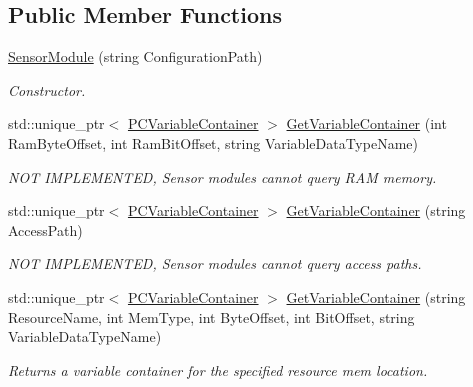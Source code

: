 \subsection*{Public Member Functions}
\begin{DoxyCompactItemize}
\item 
\hyperlink{classpc__emulator_1_1SensorModule_a5cc3adaeaf05bd9446a142088f1353c8}{Sensor\+Module} (string Configuration\+Path)\hypertarget{classpc__emulator_1_1SensorModule_a5cc3adaeaf05bd9446a142088f1353c8}{}\label{classpc__emulator_1_1SensorModule_a5cc3adaeaf05bd9446a142088f1353c8}

\begin{DoxyCompactList}\small\item\em Constructor. \end{DoxyCompactList}\item 
std\+::unique\+\_\+ptr$<$ \hyperlink{classpc__emulator_1_1PCVariableContainer}{P\+C\+Variable\+Container} $>$ \hyperlink{classpc__emulator_1_1SensorModule_affa170aa3378e2a1947eb761b308ad04}{Get\+Variable\+Container} (int Ram\+Byte\+Offset, int Ram\+Bit\+Offset, string Variable\+Data\+Type\+Name)
\begin{DoxyCompactList}\small\item\em N\+OT I\+M\+P\+L\+E\+M\+E\+N\+T\+ED, Sensor modules cannot query R\+AM memory. \end{DoxyCompactList}\item 
std\+::unique\+\_\+ptr$<$ \hyperlink{classpc__emulator_1_1PCVariableContainer}{P\+C\+Variable\+Container} $>$ \hyperlink{classpc__emulator_1_1SensorModule_aa7ed0083532cab1380b6573f96760efa}{Get\+Variable\+Container} (string Access\+Path)
\begin{DoxyCompactList}\small\item\em N\+OT I\+M\+P\+L\+E\+M\+E\+N\+T\+ED, Sensor modules cannot query access paths. \end{DoxyCompactList}\item 
std\+::unique\+\_\+ptr$<$ \hyperlink{classpc__emulator_1_1PCVariableContainer}{P\+C\+Variable\+Container} $>$ \hyperlink{classpc__emulator_1_1SensorModule_af8b9aaded3c5eafff7742f79bb4b52fd}{Get\+Variable\+Container} (string Resource\+Name, int Mem\+Type, int Byte\+Offset, int Bit\+Offset, string Variable\+Data\+Type\+Name)
\begin{DoxyCompactList}\small\item\em Returns a variable container for the specified resource mem location. \end{DoxyCompactList}\end{DoxyCompactItemize}
